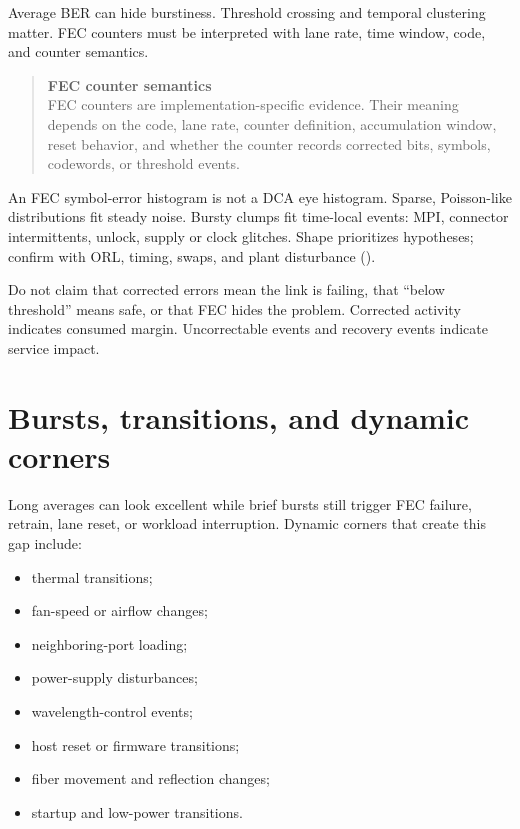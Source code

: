Average BER can hide burstiness. Threshold crossing and temporal clustering
matter. FEC counters must be interpreted with lane rate, time window, code, and
counter semantics.

\begin{quote}
\noindent\textbf{FEC counter semantics}\\[0.35em]
FEC counters are implementation-specific evidence. Their meaning depends on the
code, lane rate, counter definition, accumulation window, reset behavior, and
whether the counter records corrected bits, symbols, codewords, or threshold
events.
\end{quote}

An FEC symbol-error histogram is not a DCA eye histogram. Sparse, Poisson-like
distributions fit steady noise. Bursty clumps fit time-local events: MPI,
connector intermittents, unlock, supply or clock glitches. Shape prioritizes
hypotheses; confirm with ORL, timing, swaps, and plant disturbance
().

Do not claim that corrected errors mean the link is failing, that ``below
threshold'' means safe, or that FEC hides the problem. Corrected activity
indicates consumed margin. Uncorrectable events and recovery events indicate
service impact.

\section{Bursts, transitions, and dynamic corners}
\label{sec:ops-bursts-transitions}

Long averages can look excellent while brief bursts still trigger FEC failure,
retrain, lane reset, or workload interruption. Dynamic corners that create this
gap include:

\begin{itemize}
\item thermal transitions;
\item fan-speed or airflow changes;
\item neighboring-port loading;
\item power-supply disturbances;
\item wavelength-control events;
\item host reset or firmware transitions;
\item fiber movement and reflection changes;
\item startup and low-power transitions.
\end{itemize}

